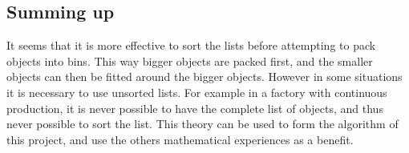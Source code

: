\subsection{Summing up}
It seems that it is more effective to sort the lists before attempting to pack objects into bins. This way bigger objects are packed first, and the smaller objects can then be fitted around the bigger objects. However in some situations it is necessary to use unsorted lists. For example in a factory with continuous production, it is never possible to have the complete list of objects, and thus never possible to sort the list. This theory can be used to form the algorithm of this project, and use the others mathematical experiences as a benefit.

